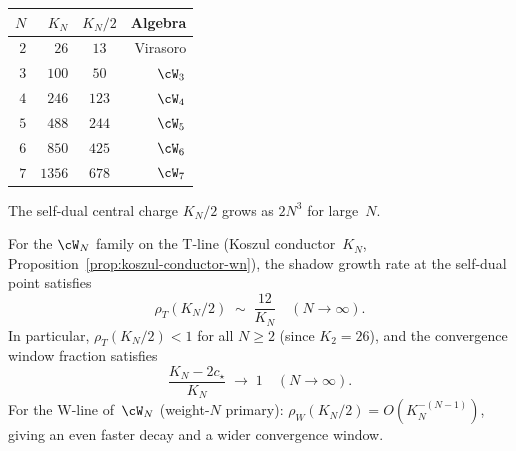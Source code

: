 \begin{center}
\renewcommand{\arraystretch}{1.2}
\begin{tabular}{rrcr}
\toprule
$N$ & $K_N$ & $K_N/2$ & \textbf{Algebra} \\
\midrule
$2$ & $26$ & $13$ & Virasoro \\
$3$ & $100$ & $50$ & $\cW_3$ \\
$4$ & $246$ & $123$ & $\cW_4$ \\
$5$ & $488$ & $244$ & $\cW_5$ \\
$6$ & $850$ & $425$ & $\cW_6$ \\
$7$ & $1356$ & $678$ & $\cW_7$ \\
\bottomrule
\end{tabular}

\smallskip\noindent
{\small The self-dual central charge $K_N/2$ grows as
$2N^3$ for large~$N$.}
\end{center}

\begin{proposition}
\label{prop:propagator-universality}
\ClaimStatusProvedHere
{}
For the $\cW_N$ family on the T-line
\textup{(}Koszul conductor~$K_N$,
Proposition~\textup{\ref{prop:koszul-conductor-wn}}\textup{)}, the
shadow growth rate at the self-dual point satisfies
\begin{equation}\label{eq:rho-self-dual-asymptotic}
  \rho_T(K_N/2)
  \;\sim\;
  \frac{12}{K_N}
  \quad(N \to \infty).
\end{equation}
In particular, $\rho_T(K_N/2) < 1$ for all $N \geq 2$
\textup{(}since $K_2 = 26$\textup{)}, and the
convergence window fraction satisfies
\begin{equation}\label{eq:window-fraction}
  \frac{K_N - 2c_\star}{K_N}
  \;\to\; 1
  \quad(N \to \infty).
\end{equation}
For the W-line of~$\cW_N$
\textup{(}weight-$N$ primary\textup{)}:
$\rho_W(K_N/2) = O(K_N^{-(N-1)})$, giving an even faster
decay and a wider convergence window.
\end{proposition}

